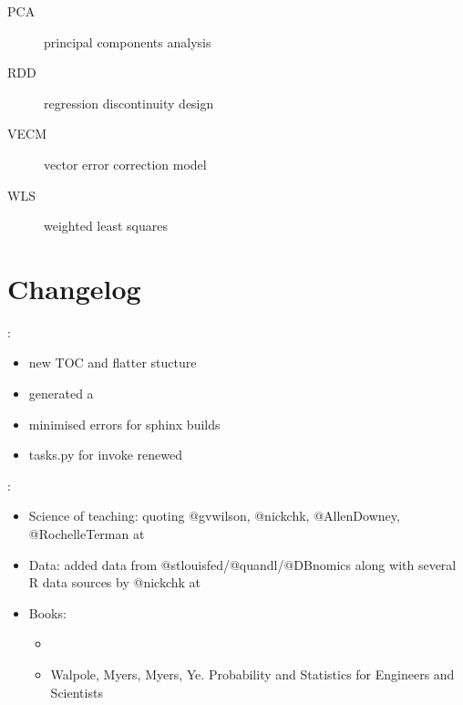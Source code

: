 \documentclass[letterpaper,10pt,english]{sphinxmanual}
\begin{document}
\begin{description}
\item[{PCA\label{\detokenize{acronyms:term-pca}}}] \leavevmode
principal components analysis

\item[{RDD\label{\detokenize{acronyms:term-rdd}}}] \leavevmode
regression discontinuity design

\item[{VECM\label{\detokenize{acronyms:term-vecm}}}] \leavevmode
vector error correction model

\item[{WLS\label{\detokenize{acronyms:term-wls}}}] \leavevmode
weighted least squares

\end{description}


\chapter{Changelog}
\label{\detokenize{roadmap:changelog}}\label{\detokenize{roadmap::doc}}
:
\begin{itemize}
\item {} 
new TOC and flatter stucture

\item {} 
generated a 

\item {} 
minimised errors for sphinx builds

\item {} 
tasks.py for invoke renewed

\end{itemize}

:
\begin{itemize}
\item {} 
Science of teaching: quoting @gvwilson, @nickchk, @AllenDowney, @RochelleTerman at 

\item {} 
Data: added data from @stlouisfed/@quandl/@DBnomics along with several R data sources by @nickchk at 

\item {} 
Books:
\begin{itemize}
\item {} 

\item {} 
Walpole, Myers, Myers, Ye. Probability and Statistics for Engineers and Scientists

\end{itemize}

\end{itemize}
\end{document}

